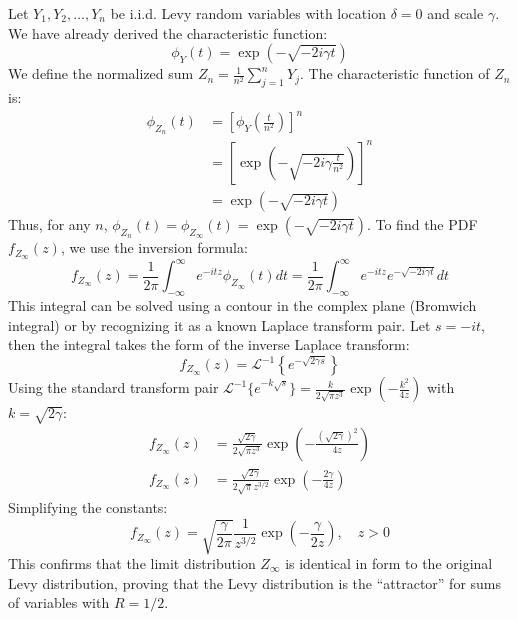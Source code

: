 \documentclass[12pt]{article}
\def\alpha{R}
\begin{document}
\begin{singlespace}
Let $Y_1, Y_2, \dots, Y_n$ be i.i.d. Levy random variables with location $\delta = 0$ and scale $\gamma$. We have already derived the characteristic function:
\begin{equation}
\phi_Y(t) = \exp\left( -\sqrt{-2i\gamma t} \right)
\end{equation}
We define the normalized sum $Z_n = \frac{1}{n^2} \sum_{j=1}^n Y_j$. The characteristic function of $Z_n$ is:
\begin{align}
\phi_{Z_n}(t) &= \left[ \phi_Y\left( \frac{t}{n^2} \right) \right]^n \\
&= \left[ \exp\left( -\sqrt{-2i\gamma \frac{t}{n^2}} \right) \right]^n \\
&= \exp\left( -\sqrt{-2i\gamma t} \right)
\end{align}
Thus, for any $n$, $\phi_{Z_n}(t) = \phi_{Z_\infty}(t) = \exp\left( -\sqrt{-2i\gamma t} \right)$. To find the PDF $f_{Z_\infty}(z)$, we use the inversion formula:
\begin{equation}
f_{Z_\infty}(z) = \frac{1}{2\pi} \int_{-\infty}^{\infty} e^{-itz} \phi_{Z_\infty}(t) dt = \frac{1}{2\pi} \int_{-\infty}^{\infty} e^{-itz} e^{-\sqrt{-2i\gamma t}} dt
\end{equation}
This integral can be solved using a contour in the complex plane (Bromwich integral) or by recognizing it as a known Laplace transform pair. Let $s = -it$, then the integral takes the form of the inverse Laplace transform:
\begin{equation}
f_{Z_\infty}(z) = \mathcal{L}^{-1} \left\{ e^{-\sqrt{2\gamma s}} \right\}
\end{equation}
Using the standard transform pair $\mathcal{L}^{-1} \{ e^{-k\sqrt{s}} \} = \frac{k}{2\sqrt{\pi z^3}} \exp\left(-\frac{k^2}{4z}\right)$ with $k = \sqrt{2\gamma}$:
\begin{align}
f_{Z_\infty}(z) &= \frac{\sqrt{2\gamma}}{2\sqrt{\pi z^3}} \exp\left( -\frac{(\sqrt{2\gamma})^2}{4z} \right) \\
f_{Z_\infty}(z) &= \frac{\sqrt{2\gamma}}{2\sqrt{\pi} z^{3/2}} \exp\left( -\frac{2\gamma}{4z} \right)
\end{align}
Simplifying the constants:
\begin{equation}
f_{Z_\infty}(z) = \sqrt{\frac{\gamma}{2\pi}} \frac{1}{z^{3/2}} \exp\left( -\frac{\gamma}{2z} \right), \quad z > 0
\end{equation}
This confirms that the limit distribution $Z_\infty$ is identical in form to the original Levy distribution, proving that the Levy distribution is the ``attractor'' for sums of variables with $\alpha=1/2$.


\end{singlespace}
\end{document}
